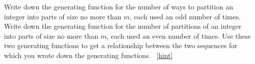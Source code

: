 \documentclass{book}
\begin{document}
\setcounter{project}{326}
\addtocounter{project}{-1}
\begin{activity}[]\label{activity-319}
\hypertarget{p-1651}{}%
Write down the generating function for the number of ways to partition an integer into parts of size no more than \(m\), each used an odd number of times. Write down the generating function for the number of partitions of an integer into parts of size no more than \(m\), each used an even number of times. Use these two generating functions to get a relationship between the two sequences for which you wrote down the generating functions.%
~\hfill{\tiny\hyperlink{a-326}{[hint]}\hypertarget{q-326}{}}\end{activity}
\end{document}
